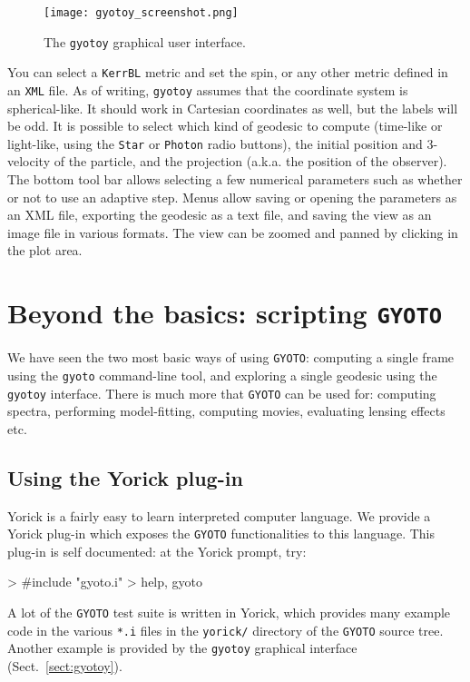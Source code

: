 \documentclass[a4paper,12pt]{article}
\begin{document}
\begin{figure}
  \centering
  \texttt{[image: gyotoy\_screenshot.png]}
  \caption{The \texttt{gyotoy} graphical user interface.}
  \label{fig:gyotoy}
\end{figure}
You can select a \texttt{KerrBL} metric and set the spin, or any other
metric defined in an \texttt{XML} file. As of writing, \texttt{gyotoy}
assumes that the coordinate system is spherical-like. It should work
in Cartesian coordinates as well, but the labels will be odd. It is
possible to select which kind of geodesic to compute (time-like or
light-like, using the \texttt{Star} or \texttt{Photon} radio buttons),
the initial position and 3-velocity of the particle, and the
projection (a.k.a. the position of the observer). The bottom tool bar
allows selecting a few numerical parameters such as whether or not to
use an adaptive step. Menus allow saving or opening the parameters as
an XML file, exporting the geodesic as a text file, and saving the
view as an image file in various formats. The view can be zoomed and
panned by clicking in the plot area.

\section{Beyond the basics: scripting \texttt{GYOTO}}

We have seen the two most basic ways of using \texttt{GYOTO}:
computing a single frame using the \texttt{gyoto} command-line tool,
and exploring a single geodesic using the \texttt{gyotoy}
interface. There is much more that \texttt{GYOTO} can be used for:
computing spectra, performing model-fitting, computing movies,
evaluating lensing effects etc.

\subsection{Using the Yorick plug-in}
\label{sect:yorick}
Yorick is a fairly easy to learn interpreted computer language. We
provide a Yorick plug-in which exposes the \texttt{GYOTO}
functionalities to this language. This plug-in is self documented: at
the Yorick prompt, try:
\begin{code}
 > #include "gyoto.i"
 > help, gyoto
\end{code}

A lot of the \texttt{GYOTO} test suite is written in Yorick, which
provides many example code in the various \texttt{*.i} files in the
\texttt{yorick/} directory of the \texttt{GYOTO} source tree. Another
example is provided by the \texttt{gyotoy} graphical interface
(Sect.~\ref{sect:gyotoy}).
\end{document}

